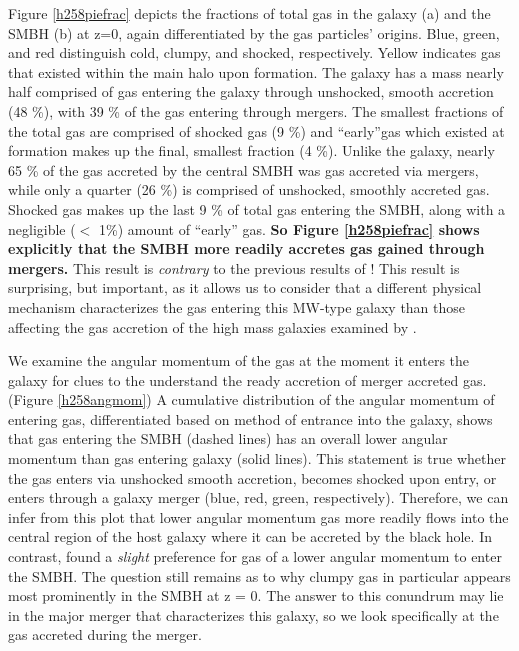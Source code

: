 \documentclass[manuscript]{aastex}
\begin{document}
Figure \ref{h258piefrac} depicts the fractions of total gas in the galaxy (a) and the SMBH (b) at z=0, again differentiated by the gas particles' origins. Blue, green, and red distinguish cold, clumpy, and shocked, respectively. Yellow indicates gas that existed within the main halo upon formation. The galaxy has a mass nearly half comprised of gas entering the galaxy through unshocked, smooth accretion (48 \%), with 39 \% of the gas entering through mergers. The smallest fractions of the total gas are comprised of shocked gas (9 \%) and ``early''gas which existed at formation makes up the final, smallest fraction (4 \%). Unlike the galaxy, nearly 65 \% of the gas accreted by the central SMBH was gas accreted via mergers, while only a quarter (26 \%) is comprised of unshocked, smoothly accreted gas. Shocked gas makes up the last 9 \% of total gas entering the SMBH, along with a negligible ($<$ 1\%) amount of ``early'' gas. \textbf{So Figure \ref{h258piefrac} shows explicitly that the SMBH more readily accretes gas gained through mergers.} This result is \textit{contrary} to the previous results of \cite{Bellovary2013}! This result is surprising, but important, as it allows us to consider that a different physical mechanism characterizes the gas entering this MW-type galaxy than those affecting the gas accretion of the high mass galaxies examined by \cite{Bellovary2013}. 

We examine the angular momentum of the gas at the moment it enters the galaxy for clues to the understand the ready accretion of merger accreted gas. (Figure \ref{h258angmom}) A cumulative distribution of the angular momentum of entering gas, differentiated based on method of entrance into the galaxy, shows that gas entering the SMBH (dashed lines) has an overall lower angular momentum than gas entering galaxy (solid lines). This statement is true whether the gas enters via unshocked smooth accretion, becomes shocked upon entry, or enters through a galaxy merger (blue, red, green, respectively). Therefore, we can infer from this plot that lower angular momentum gas more readily flows into the central region of the host galaxy where it can be accreted by the black hole. In contrast, \cite{Bellovary2013} found a \textit{slight} preference for gas of a lower angular momentum to enter the SMBH. The question still remains as to why clumpy gas in particular appears most prominently in the SMBH at z = 0. The answer to this conundrum may lie in the major merger that characterizes this galaxy, so we look specifically at the gas accreted during the merger. 
\end{document}
